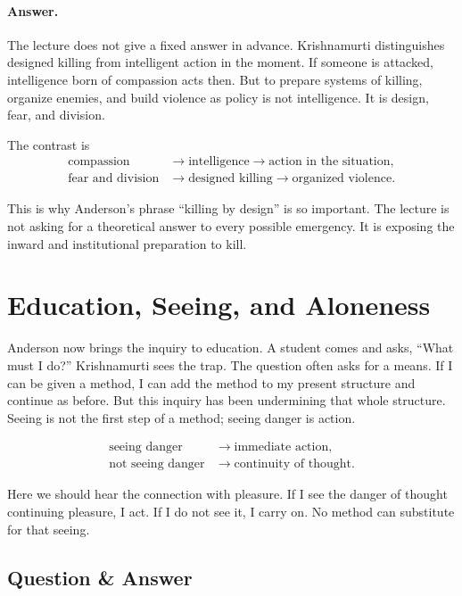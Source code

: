 \paragraph{Answer.}
The lecture does not give a fixed answer in advance. Krishnamurti distinguishes designed killing from intelligent action in the moment. If someone is attacked, intelligence born of compassion acts then. But to prepare systems of killing, organize enemies, and build violence as policy is not intelligence. It is design, fear, and division.

The contrast is
\begin{align}
\text{compassion} &\longrightarrow \text{intelligence} \longrightarrow \text{action in the situation},\\
\text{fear and division} &\longrightarrow \text{designed killing} \longrightarrow \text{organized violence}.
\end{align}

This is why Anderson's phrase ``killing by design'' is so important. The lecture is not asking for a theoretical answer to every possible emergency. It is exposing the inward and institutional preparation to kill.

\section{Education, Seeing, and Aloneness}

Anderson now brings the inquiry to education. A student comes and asks, ``What must I do?'' Krishnamurti sees the trap. The question often asks for a means. If I can be given a method, I can add the method to my present structure and continue as before. But this inquiry has been undermining that whole structure. Seeing is not the first step of a method; seeing danger is action.

\begin{align}
\text{seeing danger} &\longrightarrow \text{immediate action},\\
\text{not seeing danger} &\longrightarrow \text{continuity of thought}.
\end{align}

Here we should hear the connection with pleasure. If I see the danger of thought continuing pleasure, I act. If I do not see it, I carry on. No method can substitute for that seeing.

\subsection{Question \& Answer}

